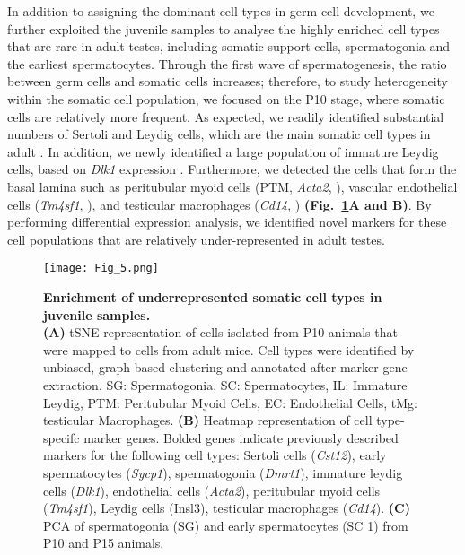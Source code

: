 In addition to assigning the dominant cell types in germ cell development, we further exploited the juvenile samples to analyse the highly enriched cell types that are rare in adult testes, including somatic support cells, spermatogonia and the earliest spermatocytes.  Through the first wave of spermatogenesis, the ratio between germ cells and somatic cells increases; therefore, to study heterogeneity within the somatic cell population, we focused on the P10 stage, where somatic cells are relatively more frequent. As expected, we readily identified substantial numbers of Sertoli and Leydig cells, which are the main somatic cell types in adult \citep{Griswold1998, Haider2004}.  In addition, we newly identified a large population of immature Leydig cells, based on \textit{Dlk1} expression \citep{Lottrup2014}. Furthermore, we detected the cells that form the basal lamina such as peritubular myoid cells (PTM, \textit{Acta2}, \citep{Cool2008}), vascular endothelial cells (\textit{Tm4sf1}, \citep{Shih2009}), and testicular macrophages (\textit{Cd14}, \citep{Kitchens2000}) \textbf{(Fig.~\ref{fig3:somatic_cells}A and B)}. By performing differential expression analysis, we identified novel markers for these cell populations that are relatively under-represented in adult testes.\\

\begin{figure}[!h]
\centering
\texttt{[image: Fig\_5.png]}
\caption[Enrichment of under-represented somatic cell types in juvenile samples]{\textbf{Enrichment of underrepresented somatic cell types in juvenile samples.} \\
\textbf{(A)} tSNE representation of cells isolated from P10 animals that were mapped to cells from adult mice. Cell types were identified by unbiased, graph-based clustering and annotated after marker gene extraction. SG: Spermatogonia, SC: Spermatocytes, IL: Immature Leydig, PTM: Peritubular Myoid Cells, EC: Endothelial Cells, tMg: testicular Macrophages. \textbf{(B)} Heatmap representation of cell type-specifc marker genes. Bolded genes indicate previously described markers for the following cell types: Sertoli cells (\textit{Cst12}), early spermatocytes (\textit{Sycp1}), spermatogonia (\textit{Dmrt1}), immature leydig cells (\textit{Dlk1}), endothelial cells (\textit{Acta2}), peritubular myoid cells (\textit{Tm4sf1}), Leydig cells (Insl3), testicular macrophages (\textit{Cd14}). \textbf{(C)} PCA of spermatogonia (SG) and early spermatocytes (SC 1) from P10 and P15 animals. 
}
\label{fig3:somatic_cells}
\end{figure}

